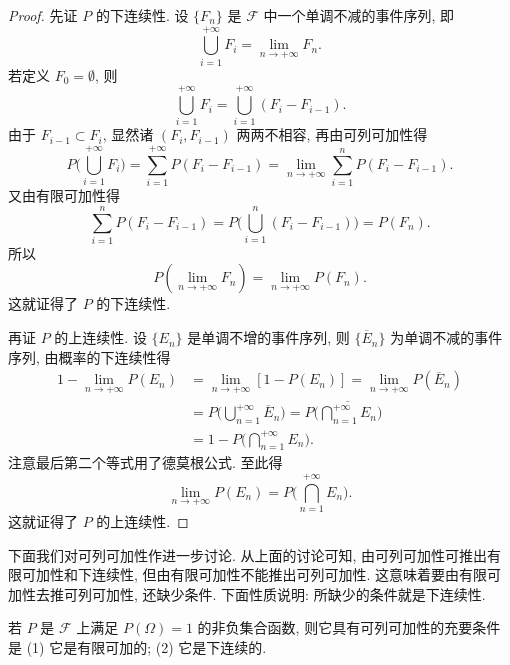 \begin{proof}
  先证 $P$ 的下连续性.
  设 $\{F_n\}$ 是 $\mathscr{F}$ 中一个单调不减的事件序列,
  即
  \[
    \bigcup _{i=1} ^{+\infty} F_i = \lim _{n \to +\infty} F_n.
  \]
  若定义 $F_0 = \emptyset$,
  则
  \[
    \bigcup _{i=1} ^{+\infty} F_i = \bigcup _{i=1} ^{+\infty} (F_i - F_{i-1}).
  \]
  由于 $F_{i-1} \subset F_i$,
  显然诸 $(F_i, F_{i-1})$ 两两不相容,
  再由可列可加性得
  \[
    P \biggl( \bigcup _{i=1} ^{+\infty} F_i \biggr) = \sum _{i=1} ^{+\infty} P (F_i - F_{i-1}) = \lim_{n \to +\infty} \sum _{i=1} ^n P (F_i - F_{i-1}).
  \]
  又由有限可加性得
  \[
    \sum _{i=1} ^n P (F_i - F_{i-1}) = P \biggl( \bigcup _{i=1} ^n (F_i - F_{i-1}) \biggr) = P (F_n).
  \]
  所以
  \[
    P (\lim _{n \to +\infty} F_n) = \lim _{n \to +\infty} P (F_n).
  \]
  这就证得了 $P$ 的下连续性.

  再证 $P$ 的上连续性.
  设 $\{ E_n \}$ 是单调不增的事件序列,
  则 $\{ \overline{E}_n \}$ 为单调不减的事件序列,
  由概率的下连续性得
  \begin{align*}
    1 - \lim _{n \to +\infty} P (E_n)
    &= \lim _{n \to +\infty} [1 - P (E_n)] = \lim _{n \to +\infty} P (\overline{E} _n)\\
    &= P \biggl( \bigcup _{n=1} ^{+\infty} \overline{E}_n \biggr)
    = P \biggl( \overline{\bigcap _{n=1} ^{+\infty} E_n} \biggr)\\
    &= 1 - P \biggl( \bigcap _{n=1} ^{+\infty} E_n \biggr).
  \end{align*}
  注意最后第二个等式用了德莫根公式.
  至此得
  \[
    \lim _{n \to +\infty} P (E_n) = P \biggl( \bigcap _{n=1} ^{+\infty} E_n \biggr).
  \]
  这就证得了 $P$ 的上连续性.
\end{proof}

下面我们对可列可加性作进一步讨论.
从上面的讨论可知,
由可列可加性可推出有限可加性和下连续性,
但由有限可加性不能推出可列可加性.
这意味着要由有限可加性去推可列可加性,
还缺少条件.
下面性质说明:
所缺少的条件就是下连续性.

\begin{property}\label{prop1.3.8}
  若 $P$ 是 $\mathscr{F}$ 上满足 $P(\Omega) = 1$ 的非负集合函数,
  则它具有可列可加性的充要条件是 (1) 它是有限可加的; (2) 它是下连续的.
\end{property}

